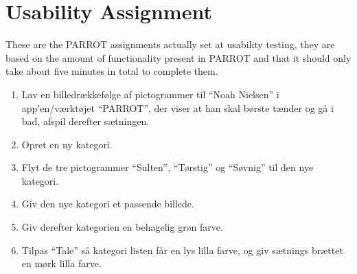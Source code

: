 \section{Usability Assignment}
\label{sec:UseQuest}
These are the PARROT assignments actually set at usability testing, they are based on the amount of functionality present in PARROT and that it should only take about five minutes in total to complete them.

\begin{enumerate}
	\item Lav en billedr\ae{}kkef\o{}lge af pictogrammer til "`Noah Nielsen"' i app'en/v\ae{}rkt\o{}jet "`PARROT"', der viser at han skal b\o{}rste t\ae{}nder og g\aa{} i bad, afspil derefter s\ae{}tningen.
	\item Opret en ny kategori.
	\item Flyt de tre pictogrammer "`Sulten"', "`T\o{}rstig"' og "`S\o{}vnig"' til den nye kategori.
	\item Giv den nye kategori et passende billede.
	\item Giv derefter kategorien en behagelig gr\o{}n farve.
	\item Tilpas "`Tale"' s\aa{} kategori listen f\aa{}r en lys lilla farve, og giv s\ae{}tnings br\ae{}ttet en m\o{}rk lilla farve.
\end{enumerate}
